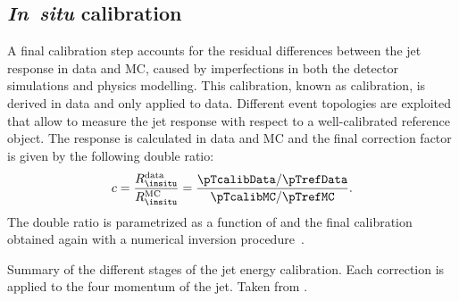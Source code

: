 \subsection{\textbf{\emph{In~situ}} calibration}
\label{subsec:insitu-calibration}
A final calibration step accounts for the residual differences between the jet response in data and MC, caused by imperfections in both the detector simulations and physics modelling. This calibration, known as \insitu calibration, is derived in data and only applied to data.
Different event topologies are exploited that allow to measure the jet response with respect to a well-calibrated reference object. The \insitu response is calculated in data and MC and the final correction factor is given by the following double ratio:
\begin{equation}
    c = \frac{R_{\insitu}^{\text{data}}}{R_{\insitu}^{\text{MC}}} = \frac{ \pTcalibData / \pTrefData}{\pTcalibMC / \pTrefMC}.
\end{equation}
The double ratio is parametrized as a function of \pTref and the final calibration obtained again with a numerical inversion procedure~\cite{PERF-2011-03}.




\begin{table}
    \caption{Summary of the different stages of the jet energy calibration. Each correction is applied to the four momentum of the jet. Taken from .}
    \label{tab:jes-calibration}
\end{table}


